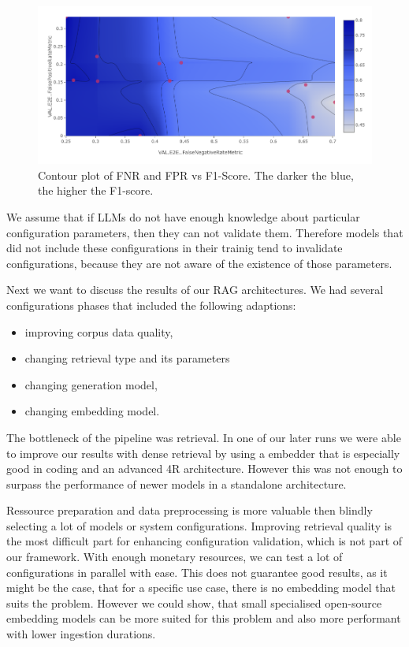 \begin{figure}[!ht]
    \centering
    \includegraphics[width=\textwidth]{images/FNR-FPR-F1.png}
    \caption{Contour plot of FNR and FPR vs F1-Score. The darker the blue, the higher the F1-score.}
    \label{fig:fnrfpr}
\end{figure}

We assume that if LLMs do not have enough knowledge about particular configuration parameters, then they can not validate them. Therefore models that did not include these configurations in their trainig tend to invalidate configurations, because they are not aware of the existence of those parameters.

Next we want to discuss the results of our RAG architectures. We had several configurations phases that included the following adaptions:
\begin{itemize}
    \item improving corpus data quality,
    \item changing retrieval type and its parameters
    \item changing generation model,
    \item changing embedding model.
\end{itemize}

The bottleneck of the pipeline was retrieval. In one of our later runs we were able to improve our results with dense retrieval by using a embedder that is especially good in coding and an advanced 4R architecture. However this was not enough to surpass the performance of newer models in a standalone architecture. 

Ressource preparation and data preprocessing is more valuable then blindly selecting a lot of models or system configurations. Improving retrieval quality is the most difficult part for enhancing configuration validation, which is not part of our framework. With enough monetary resources, we can test a lot of configurations in parallel with ease. This does not guarantee good results, as it might be the case, that for a specific use case, there is no embedding model that suits the problem. However we could show, that small specialised open-source embedding models can be more suited for this problem and also more performant with lower ingestion durations. 

